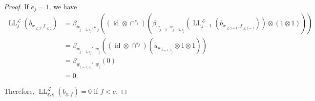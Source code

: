 \documentclass[10pt,a4paper]{amsart}
\DeclareMathOperator{\LL}{LL}
\DeclareMathOperator{\id}{id}
\newcommand{\scrL}{\mathcal{L}}
\newcommand{\ue}{\underline{e}}
\newcommand{\uf}{\underline{f}}
\newcommand{\uw}{\underline{w}}
\newcommand{\ux}{\underline{x}}
\begin{document}
\begin{proof}
    If $e_j = 1$, we have
    \begin{align*}
        \LL_j^{\scrL} (b_{\ux_{\leq j}, \uf_{\leq j}}) &= \beta_{\uw_{j-1,s_j}, \uw_j} \left( (\id \otimes \cap^{s_j}) \left( \beta_{\uw_{j-1}, \uw_{j-1,s_j}} \left( \LL_{j-1}^{\scrL} (b_{\ux_{\leq j-1}, \uf_{\leq j-1}}) \right) \otimes (1 \otimes 1) \right) \right) \\
        &= \beta_{\uw_{j-1,s_j}', \uw_j} \left( (\id \otimes \cap^{s_j}) \left( u_{\uw_{j-1,s_j}} \otimes 1 \otimes 1 \right) \right) \\
        &= \beta_{\uw_{j-1,s_j}', \uw_j} \left( 0\right) \\
        &= 0.
    \end{align*}

    Therefore, $\LL_{\ux, \ue}^{\scrL} (b_{\ux, \uf}) = 0$ if $\uf < \ue$.
\end{proof}
\end{document}
